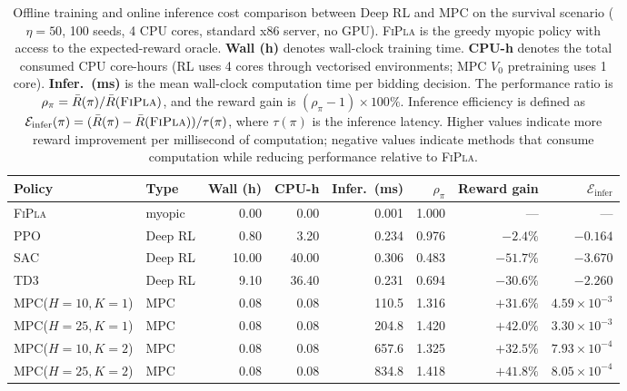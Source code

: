 \documentclass[11pt]{article}
\begin{document}
\begin{table}[H]
\centering
\small
\caption{Offline training and online inference cost comparison between Deep RL
         and MPC on the survival scenario ($\eta=50$, 100 seeds,
         4 CPU cores, standard x86 server, no GPU).
         \textsc{FiPla} is the greedy myopic policy with access to the
         expected-reward oracle.
         \textbf{Wall (h)} denotes wall-clock training time.
         \textbf{CPU-h} denotes the total consumed CPU core-hours
         (RL uses 4 cores through vectorised environments; MPC $V_0$ pretraining
         uses 1 core).
         \textbf{Infer.\ (ms)} is the mean wall-clock computation time per
         bidding decision.
         The performance ratio is
         $\rho_\pi=\bar{R}(\pi)/\bar{R}(\textsc{FiPla})$,
         and the reward gain is
         $(\rho_\pi-1)\times100\%$.
         Inference efficiency is defined as
         $\mathcal{E}_{\mathrm{infer}}(\pi)=
         (\bar{R}(\pi)-\bar{R}(\textsc{FiPla}))/\tau(\pi)$,
         where $\tau(\pi)$ is the inference latency.
         Higher values indicate more reward improvement per millisecond of
         computation; negative values indicate methods that consume computation
         while reducing performance relative to \textsc{FiPla}.}
\label{tab:rl-vs-mpc}
\setlength{\tabcolsep}{4pt}
\begin{tabular}{llrrrrrr}
\toprule
Policy & Type & Wall (h) & CPU-h & Infer.\ (ms) &
$\rho_\pi$ & Reward gain & $\mathcal{E}_{\mathrm{infer}}$ \\
\midrule
\textsc{FiPla}              & myopic  & 0.00 &  0.00 &   0.001 & 1.000 & ---       & --- \\
\textsc{PPO}                & Deep RL & 0.80 &  3.20 &   0.234 & 0.976 & $-2.4\%$  & $-0.164$ \\
\textsc{SAC}                & Deep RL &10.00 & 40.00 &   0.306 & 0.483 & $-51.7\%$ & $-3.670$ \\
\textsc{TD3}                & Deep RL & 9.10 & 36.40 &   0.231 & 0.694 & $-30.6\%$ & $-2.260$ \\
\midrule
\textsc{MPC}($H=10,K=1$)    & MPC     & 0.08 &  0.08 & 110.5 & 1.316 & $+31.6\%$ & $4.59\times10^{-3}$ \\
\textsc{MPC}($H=25,K=1$)    & MPC     & 0.08 &  0.08 & 204.8 & 1.420 & $+42.0\%$ & $3.30\times10^{-3}$ \\
\textsc{MPC}($H=10,K=2$)    & MPC     & 0.08 &  0.08 & 657.6 & 1.325 & $+32.5\%$ & $7.93\times10^{-4}$ \\
\textsc{MPC}($H=25,K=2$)    & MPC     & 0.08 &  0.08 & 834.8 & 1.418 & $+41.8\%$ & $8.05\times10^{-4}$ \\
\bottomrule
\end{tabular}


\end{table}
\end{document}
